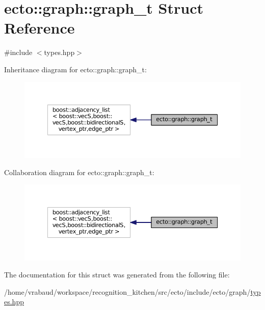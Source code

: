 \hypertarget{structecto_1_1graph_1_1graph__t}{\section{ecto\-:\-:graph\-:\-:graph\-\_\-t Struct Reference}
\label{structecto_1_1graph_1_1graph__t}
}


{\ttfamily \#include $<$types.\-hpp$>$}



Inheritance diagram for ecto\-:\-:graph\-:\-:graph\-\_\-t\-:\nopagebreak
\begin{figure}[H]
\begin{center}
\leavevmode
\includegraphics[width=350pt]{structecto_1_1graph_1_1graph__t__inherit__graph}
\end{center}
\end{figure}


Collaboration diagram for ecto\-:\-:graph\-:\-:graph\-\_\-t\-:\nopagebreak
\begin{figure}[H]
\begin{center}
\leavevmode
\includegraphics[width=350pt]{structecto_1_1graph_1_1graph__t__coll__graph}
\end{center}
\end{figure}


The documentation for this struct was generated from the following file\-:\begin{DoxyCompactItemize}
\item 
/home/vrabaud/workspace/recognition\-\_\-kitchen/src/ecto/include/ecto/graph/\hyperlink{types_8hpp}{types.\-hpp}\end{DoxyCompactItemize}
